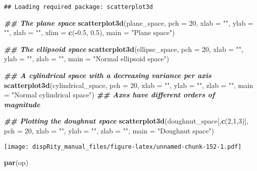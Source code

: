 \documentclass[
]{book}
\newenvironment{Shaded}{\begin{snugshade}}{\end{snugshade}}
\newcommand{\AttributeTok}[1]{\textcolor[rgb]{0.13,0.29,0.53}{#1}}
\newcommand{\DecValTok}[1]{\textcolor[rgb]{0.00,0.00,0.81}{#1}}
\newcommand{\DocumentationTok}[1]{\textcolor[rgb]{0.56,0.35,0.01}{\textbf{\textit{#1}}}}
\newcommand{\FloatTok}[1]{\textcolor[rgb]{0.00,0.00,0.81}{#1}}
\newcommand{\FunctionTok}[1]{\textcolor[rgb]{0.13,0.29,0.53}{\textbf{#1}}}
\newcommand{\NormalTok}[1]{#1}
\newcommand{\SpecialCharTok}[1]{\textcolor[rgb]{0.81,0.36,0.00}{\textbf{#1}}}
\newcommand{\StringTok}[1]{\textcolor[rgb]{0.31,0.60,0.02}{#1}}
\begin{document}
\begin{verbatim}
## Loading required package: scatterplot3d
\end{verbatim}

\begin{Shaded}
\begin{Highlighting}[]
\DocumentationTok{\#\# The plane space}
\FunctionTok{scatterplot3d}\NormalTok{(plane\_space, }\AttributeTok{pch =} \DecValTok{20}\NormalTok{, }\AttributeTok{xlab =} \StringTok{""}\NormalTok{, }\AttributeTok{ylab =} \StringTok{""}\NormalTok{, }\AttributeTok{zlab =} \StringTok{""}\NormalTok{,}
              \AttributeTok{xlim =} \FunctionTok{c}\NormalTok{(}\SpecialCharTok{{-}}\FloatTok{0.5}\NormalTok{, }\FloatTok{0.5}\NormalTok{), }\AttributeTok{main =} \StringTok{"Plane space"}\NormalTok{)}

\DocumentationTok{\#\# The ellipsoid space}
\FunctionTok{scatterplot3d}\NormalTok{(ellipse\_space, }\AttributeTok{pch =} \DecValTok{20}\NormalTok{, }\AttributeTok{xlab =} \StringTok{""}\NormalTok{, }\AttributeTok{ylab =} \StringTok{""}\NormalTok{, }\AttributeTok{zlab =} \StringTok{""}\NormalTok{,}
              \AttributeTok{main =} \StringTok{"Normal ellipsoid space"}\NormalTok{)}

\DocumentationTok{\#\# A cylindrical space with a decreasing variance per axis}
\FunctionTok{scatterplot3d}\NormalTok{(cylindrical\_space, }\AttributeTok{pch =} \DecValTok{20}\NormalTok{, }\AttributeTok{xlab =} \StringTok{""}\NormalTok{, }\AttributeTok{ylab =} \StringTok{""}\NormalTok{, }\AttributeTok{zlab =} \StringTok{""}\NormalTok{,}
              \AttributeTok{main =} \StringTok{"Normal cylindrical space"}\NormalTok{)}
\DocumentationTok{\#\# Axes have different orders of magnitude}

\DocumentationTok{\#\# Plotting the doughnut space}
\FunctionTok{scatterplot3d}\NormalTok{(doughnut\_space[,}\FunctionTok{c}\NormalTok{(}\DecValTok{2}\NormalTok{,}\DecValTok{1}\NormalTok{,}\DecValTok{3}\NormalTok{)], }\AttributeTok{pch =} \DecValTok{20}\NormalTok{, }\AttributeTok{xlab =} \StringTok{""}\NormalTok{, }\AttributeTok{ylab =} \StringTok{""}\NormalTok{,}
              \AttributeTok{zlab =} \StringTok{""}\NormalTok{, }\AttributeTok{main =} \StringTok{"Doughnut space"}\NormalTok{)}
\end{Highlighting}
\end{Shaded}

\texttt{[image: dispRity\_manual\_files/figure-latex/unnamed-chunk-152-1.pdf]}

\begin{Shaded}
\begin{Highlighting}[]
\FunctionTok{par}\NormalTok{(op)}
\end{Highlighting}
\end{Shaded}
\end{document}
